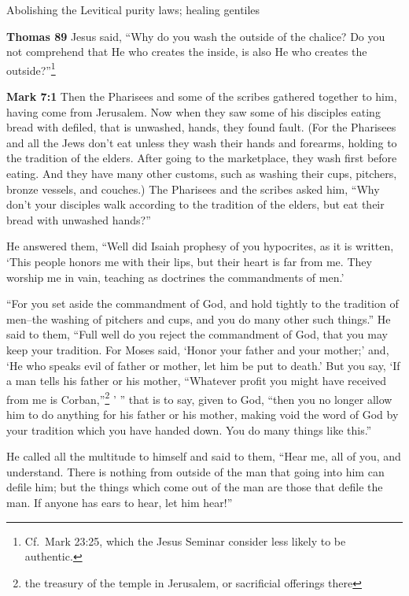 \documentclass[10pt,twoside]{article} %
\newcommand{\quotesize}{\normalsize{}}
\newenvironment{quotetext}{\begingroup\quotesize}{\endgroup}
\newcommand{\intex}[1]{\index[texts]{#1}}
\newcommand{\bible}[2]{\begin{quotetext}\textbf{#1}\intex{#1} #2\end{quotetext}}
\newcommand{\gospelmark}[2]{\bible{Mark #1}{#2}}
\newcommand{\thomas}[2]{\bible{Thomas #1}{#2}}
\begin{document}
\begin{section}{Abolishing the Levitical purity laws; healing gentiles}

\thomas{89}{
Jesus said, ``Why do you wash the outside of the chalice? Do you not comprehend that He who creates the inside, is also He who creates 
the outside?''\footnote{Cf.~Mark
23:25, which the Jesus Seminar consider less likely to be authentic.}
}

\gospelmark{7:1}{
 Then the Pharisees and some of the scribes gathered together to him, having come from Jerusalem.   Now when they saw some of his disciples eating bread with defiled, that is unwashed, hands, they found fault.   (For the Pharisees and all the Jews don't eat unless they wash their hands and forearms, holding to the tradition of the elders.
After going to the marketplace, they wash first before eating. And they have many other customs, such as washing
their cups, pitchers, bronze vessels, and couches.)   The Pharisees and the scribes asked him, ``Why don't your disciples walk according to the tradition of the elders, but eat their bread with unwashed hands?''


  He answered them, ``Well did Isaiah prophesy of you hypocrites, as it is written,
`This people honors me with their lips,
but their heart is far from me.
   They worship me in vain,
teaching as doctrines the commandments of men.'

   ``For you set aside the commandment of God, and hold tightly to the tradition of men--the washing of pitchers and cups, and you do many other such things.''   He said to them, ``Full well do you reject the commandment of God, that you may keep your tradition.    For Moses said, `Honor your father and your mother;' and, `He who speaks evil of father or mother, let him be put to death.'    But you say, `If a man tells his father or his mother, ``Whatever profit you might have received from me is Corban,''\footnote{the treasury of the temple in Jerusalem, or sacrificial offerings there} ' '' that is to say, given to God,    ``then you no longer allow him to do anything for his father or his mother,    making void the word of God by your tradition which you have handed down. You do many things like this.''

  He called all the multitude to himself and said to them, ``Hear me, all of you, and understand.    There is nothing from outside of the man that going into him can defile him; but the things which come out of the man are those that defile the man.    If anyone has ears to hear, let him hear!''

}
\end{section}
\end{document}
